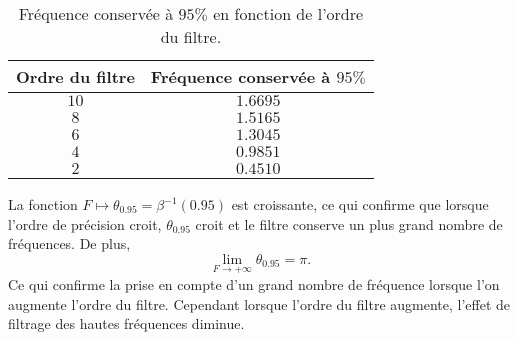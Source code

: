 \begin{table}
\begin{center}
\begin{tabular}{|c||c|}
\hline
\textbf{Ordre du filtre} & \textbf{Fréquence conservée à } $95\%$\\
\hline
\hline
$10$&$1.6695$\\
$8$&$1.5165$\\
$6$&$1.3045$\\
$4$&$0.9851$\\
$2$&$0.4510$\\
\hline
\end{tabular}
\end{center}
\caption{Fréquence conservée à $95\%$ en fonction de l'ordre du filtre.}
\label{tab:filter_095}
\end{table}

La fonction $F \mapsto \theta_{0.95} = \beta^{-1}(0.95)$ est croissante, ce qui confirme que lorsque l'ordre de précision croit, $\theta_{0.95}$ croit et le filtre conserve un plus grand nombre de fréquences. De plus, 
\begin{equation}
\lim_{F \rightarrow +\infty} \theta_{0.95} = \pi.
\end{equation}
Ce qui confirme la prise en compte d'un grand nombre de fréquence lorsque l'on augmente l'ordre du filtre. Cependant lorsque l'ordre du filtre augmente, l'effet de filtrage des hautes fréquences diminue.

